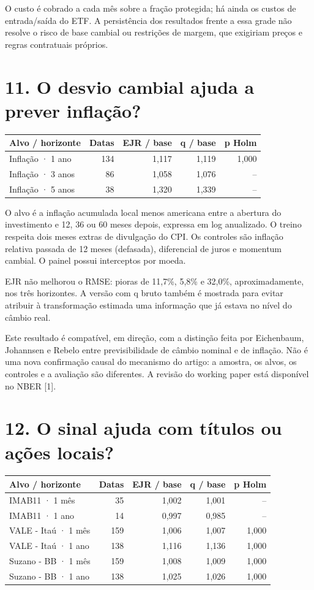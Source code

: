 \documentclass[11pt,a4paper]{article}
\begin{document}
O custo é cobrado a cada mês sobre a fração protegida; há ainda os custos de entrada/saída do ETF. A persistência dos resultados frente a essa grade não resolve o risco de base cambial ou restrições de margem, que exigiriam preços e regras contratuais próprios.

\clearpage
\section*{11. O desvio cambial ajuda a prever inflação?}\small\begin{center}\begin{tabular}{lrrrr}\toprule
Alvo / horizonte & Datas & EJR / base & q / base & p Holm \\ \midrule
Inflação · 1 ano & 134 & 1,117 & 1,119 & 1,000 \\
Inflação · 3 anos & 86 & 1,058 & 1,076 & -- \\
Inflação · 5 anos & 38 & 1,320 & 1,339 & -- \\
\bottomrule\end{tabular}\end{center}\normalsize

O alvo é a inflação acumulada local menos americana entre a abertura do investimento e 12, 36 ou 60 meses depois, expressa em log anualizado. O treino respeita dois meses extras de divulgação do CPI. Os controles são inflação relativa passada de 12 meses (defasada), diferencial de juros e momentum cambial. O painel possui interceptos por moeda.

EJR não melhorou o RMSE: pioras de 11,7\%, 5,8\% e 32,0\%, aproximadamente, nos três horizontes. A versão com q bruto também é mostrada para evitar atribuir à transformação estimada uma informação que já estava no nível do câmbio real.

Este resultado é compatível, em direção, com a distinção feita por Eichenbaum, Johannsen e Rebelo entre previsibilidade de câmbio nominal e de inflação. Não é uma nova confirmação causal do mecanismo do artigo: a amostra, os alvos, os controles e a avaliação são diferentes. A revisão do working paper está disponível no NBER [1].
\section*{12. O sinal ajuda com títulos ou ações locais?}
\small\begin{center}\begin{tabular}{lrrrr}\toprule
Alvo / horizonte & Datas & EJR / base & q / base & p Holm \\ \midrule
IMAB11 · 1 mês & 35 & 1,002 & 1,001 & -- \\
IMAB11 · 1 ano & 14 & 0,997 & 0,985 & -- \\
VALE - Itaú · 1 mês & 159 & 1,006 & 1,007 & 1,000 \\
VALE - Itaú · 1 ano & 138 & 1,116 & 1,136 & 1,000 \\
Suzano - BB · 1 mês & 159 & 1,008 & 1,009 & 1,000 \\
Suzano - BB · 1 ano & 138 & 1,025 & 1,026 & 1,000 \\
\bottomrule\end{tabular}\end{center}\normalsize
\end{document}
